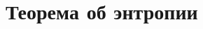 \documentclass[discrete.tex]{subfiles}
\begin{document}
\section{Теорема об энтропии}
\end{document}
